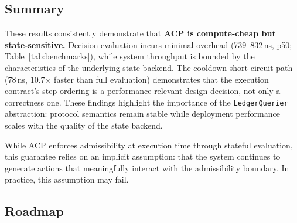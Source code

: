 \documentclass[11pt]{article}
\theoremstyle{definition}
\begin{document}
\subsection{Summary}

These results consistently demonstrate that \textbf{ACP is compute-cheap but state-sensitive.}
Decision evaluation incurs minimal overhead (739--832\,ns, p50; Table~\ref{tab:benchmarks}), while system throughput is bounded
by the characteristics of the underlying state backend.
The cooldown short-circuit path (78\,ns, 10.7$\times$ faster than full evaluation) demonstrates
that the execution contract's step ordering is a performance-relevant design decision, not only
a correctness one.
These findings highlight the importance of the \texttt{LedgerQuerier} abstraction: protocol
semantics remain stable while deployment performance scales with the quality of the state backend.

While ACP enforces admissibility at execution time through stateful evaluation,
this guarantee relies on an implicit assumption: that the system continues to
generate actions that meaningfully interact with the admissibility boundary.
In practice, this assumption may fail.

\subsection{Roadmap}
\end{document}
